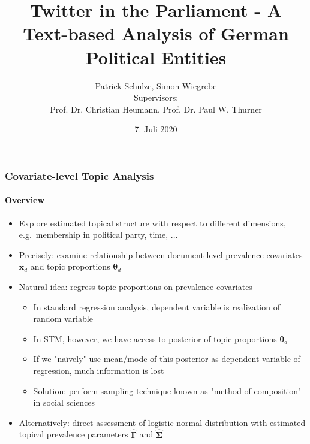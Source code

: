 \documentclass[xcolor=dvipsnames]{beamer}
\title{Twitter in the Parliament - A Text-based Analysis of German Political Entities}
\date{7. Juli 2020}
\author[author1]{Patrick Schulze, Simon Wiegrebe\\[10mm]{\small Supervisors:\\ Prof. Dr. Christian Heumann, Prof. Dr. Paul W. Thurner}}
\begin{document}
\begin{frame}
\titlepage
\end{frame}


\begin{frame}
\frametitle{Covariate-level Topic Analysis}
\framesubtitle{Overview}
\begin{itemize}
\item Explore estimated topical structure with respect to different dimensions, e.g.\ membership in political party, time, $\dots$
\item Precisely: examine relationship between document-level prevalence covariates $\boldsymbol{x}_d$ and topic proportions $\boldsymbol{\theta}_d$
\item Natural idea: regress topic proportions on prevalence covariates
\begin{itemize}
\item In standard regression analysis, dependent variable is realization of random variable
\item In STM, however, we have access to posterior of topic proportions $\boldsymbol{\theta}_d$
\item If we "na{\"i}vely" use mean/mode of this posterior as dependent variable of regression, much information is lost
\item Solution: perform sampling technique known as "method of composition" in social sciences
\end{itemize}
\item Alternatively: direct assessment of logistic normal distribution with estimated topical prevalence parameters $\hat{\boldsymbol{\Gamma}}$ and $\hat{\boldsymbol{\Sigma}}$
\end{itemize}
\end{frame}
\end{document}
